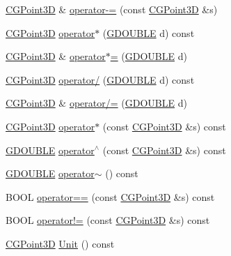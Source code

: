 \begin{DoxyCompactItemize}
\item 
\hyperlink{class_c_g_point3_d}{C\+G\+Point3\+D} \& \hyperlink{class_c_g_point3_d_a38330b5cca9046613d75461e3e03bfd8}{operator-\/=} (const \hyperlink{class_c_g_point3_d}{C\+G\+Point3\+D} \&s)
\item 
\hyperlink{class_c_g_point3_d}{C\+G\+Point3\+D} \hyperlink{class_c_g_point3_d_a6624ea8c169c739974f6d3a4caa7dd97}{operator$\ast$} (\hyperlink{_g_types_8h_afd05ac85f90ee8e2a733928545462cd4}{G\+D\+O\+U\+B\+L\+E} d) const 
\item 
\hyperlink{class_c_g_point3_d}{C\+G\+Point3\+D} \& \hyperlink{class_c_g_point3_d_a8b036b26f2c13717ee60540680d97d58}{operator$\ast$=} (\hyperlink{_g_types_8h_afd05ac85f90ee8e2a733928545462cd4}{G\+D\+O\+U\+B\+L\+E} d)
\item 
\hyperlink{class_c_g_point3_d}{C\+G\+Point3\+D} \hyperlink{class_c_g_point3_d_a4068409e2caf38dcb305303892a1c65b}{operator/} (\hyperlink{_g_types_8h_afd05ac85f90ee8e2a733928545462cd4}{G\+D\+O\+U\+B\+L\+E} d) const 
\item 
\hyperlink{class_c_g_point3_d}{C\+G\+Point3\+D} \& \hyperlink{class_c_g_point3_d_ad6aac5c355fbe242a644aa1f026efc3c}{operator/=} (\hyperlink{_g_types_8h_afd05ac85f90ee8e2a733928545462cd4}{G\+D\+O\+U\+B\+L\+E} d)
\item 
\hyperlink{class_c_g_point3_d}{C\+G\+Point3\+D} \hyperlink{class_c_g_point3_d_af18d6bb7590993ba6a81fc53a1f102ed}{operator$\ast$} (const \hyperlink{class_c_g_point3_d}{C\+G\+Point3\+D} \&s) const 
\item 
\hyperlink{_g_types_8h_afd05ac85f90ee8e2a733928545462cd4}{G\+D\+O\+U\+B\+L\+E} \hyperlink{class_c_g_point3_d_a191842e3a41563839914c1bc7939ae0f}{operator$^\wedge$} (const \hyperlink{class_c_g_point3_d}{C\+G\+Point3\+D} \&s) const 
\item 
\hyperlink{_g_types_8h_afd05ac85f90ee8e2a733928545462cd4}{G\+D\+O\+U\+B\+L\+E} \hyperlink{class_c_g_point3_d_aaa9323aa60b5dce3ecc3c446281506fb}{operator$\sim$} () const 
\item 
B\+O\+O\+L \hyperlink{class_c_g_point3_d_aafb32b858b6aa94a4b78a06fd3d3985d}{operator==} (const \hyperlink{class_c_g_point3_d}{C\+G\+Point3\+D} \&s) const 
\item 
B\+O\+O\+L \hyperlink{class_c_g_point3_d_aa42cd195eaa2f1438c2f002a244a9850}{operator!=} (const \hyperlink{class_c_g_point3_d}{C\+G\+Point3\+D} \&s) const 
\item 
\hyperlink{class_c_g_point3_d}{C\+G\+Point3\+D} \hyperlink{class_c_g_point3_d_a6be10f6c1b121d82afd45ea848f58cd2}{Unit} () const 

\end{DoxyCompactItemize}

